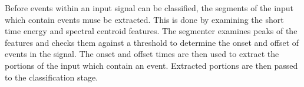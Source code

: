 Before events within an input signal can be classified, the segments of the input which contain events  muse be extracted. This is done by examining the short time energy and spectral centroid features.  The segmenter examines peaks of the features and checks them against a threshold to determine the onset and  offset of events in the signal. The onset and offset times are then used to extract the portions of the input which contain an event.  Extracted portions are then passed to the classification stage. 

